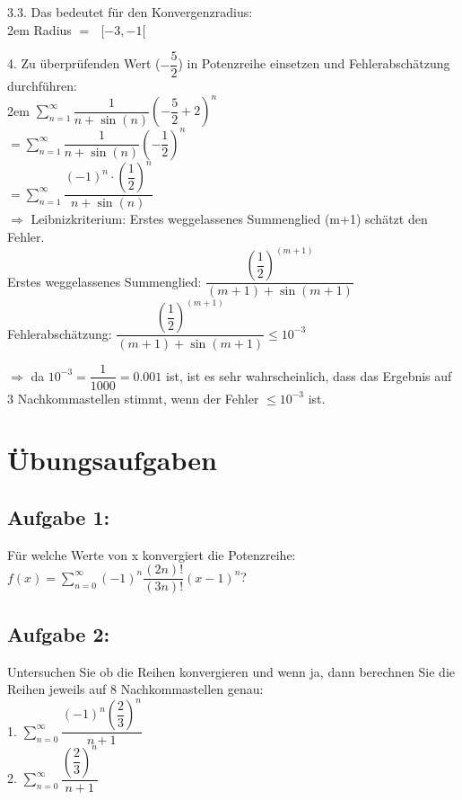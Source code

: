 \documentclass[11pt,final]{scrreprt}
\newcommand{\br} {\medskip\\}
\begin{document}
3.3. Das bedeutet für den Konvergenzradius:\\

\begingroup
\leftskip2em 
Radius $=\text{ }[-3, -1[ $\\
\par	
\endgroup 

4. Zu überprüfenden Wert ($-\dfrac{5}{2}$) in Potenzreihe einsetzen und Fehlerabschätzung durchführen:\br

\begingroup
\leftskip2em 
$\sum\limits_{n=1}^\infty \dfrac{1}{n+\sin(n)} (-\dfrac{5}{2}+2)^n $\br
$=\sum\limits_{n=1}^\infty \dfrac{1}{n+\sin(n)} (-\dfrac{1}{2})^n $\br
$=\sum\limits_{n=1}^\infty \dfrac{(-1)^n\cdot(\dfrac{1}{2})^n}{n+\sin(n)} $\br
$\Rightarrow $ Leibnizkriterium: Erstes weggelassenes Summenglied (m+1) schätzt den Fehler.\br
Erstes weggelassenes Summenglied: $\dfrac{(\dfrac{1}{2})^{(m+1)}}{(m+1)+\sin(m+1)} $\br
Fehlerabschätzung: $\dfrac{(\dfrac{1}{2})^{(m+1)}}{(m+1)+\sin(m+1)} \leq 10^{-3}$\\
\par	
\endgroup 

$\Rightarrow$ da $10^{-3} = \dfrac{1}{1000} = 0.001$ ist, ist es sehr wahrscheinlich, dass das Ergebnis auf 3 Nachkommastellen stimmt, wenn der Fehler $\leq 10^{-3}$ ist.\\

\newpage
\section{Übungsaufgaben}

\subsection*{Aufgabe 1:}
Für welche Werte von x konvergiert die Potenzreihe:\\
\hspace*{2em}$ f(x) = \sum\limits_{n=0}^\infty (-1)^n\dfrac{(2n)!}{(3n)!}(x-1)^n$?

\subsection*{Aufgabe 2:}
Untersuchen Sie ob die Reihen konvergieren und wenn ja, dann berechnen Sie die Reihen jeweils auf 8 Nachkommastellen genau:\\
\hspace*{2em}1. $ \sum\limits_{n=0}^\infty \dfrac{(-1)^n(\dfrac{2}{3})^n}{n+1}$\\
\hspace*{2em}2. $ \sum\limits_{n=0}^\infty \dfrac{(\dfrac{2}{3})^n}{n+1}$
\end{document}
